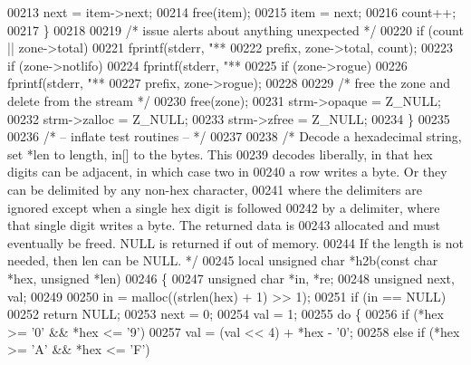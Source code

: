 \begin{DoxyCode}
{{00213         next = item->next;
00214         free(item);
00215         item = next;
00216         count++;
00217     \}
00218 
00219     \textcolor{comment}{/* issue alerts about anything unexpected */}
00220     \textcolor{keywordflow}{if} (count || zone->total)
00221         fprintf(stderr, \textcolor{stringliteral}{"** %
00222                 prefix, zone->total, count);
00223     \textcolor{keywordflow}{if} (zone->notlifo)
00224         fprintf(stderr, \textcolor{stringliteral}{"** %
00225     \textcolor{keywordflow}{if} (zone->rogue)
00226         fprintf(stderr, \textcolor{stringliteral}{"** %
00227                 prefix, zone->rogue);
00228 
00229     \textcolor{comment}{/* free the zone and delete from the stream */}
00230     free(zone);
00231     strm->opaque = Z\_NULL;
00232     strm->zalloc = Z\_NULL;
00233     strm->zfree = Z\_NULL;
00234 \}
00235 
00236 \textcolor{comment}{/* -- inflate test routines -- */}
00237 
00238 \textcolor{comment}{/* Decode a hexadecimal string, set *len to length, in[] to the bytes.  This}
00239 \textcolor{comment}{   decodes liberally, in that hex digits can be adjacent, in which case two in}
00240 \textcolor{comment}{   a row writes a byte.  Or they can be delimited by any non-hex character,}
00241 \textcolor{comment}{   where the delimiters are ignored except when a single hex digit is followed}
00242 \textcolor{comment}{   by a delimiter, where that single digit writes a byte.  The returned data is}
00243 \textcolor{comment}{   allocated and must eventually be freed.  NULL is returned if out of memory.}
00244 \textcolor{comment}{   If the length is not needed, then len can be NULL. */}
00245 local \textcolor{keywordtype}{unsigned} \textcolor{keywordtype}{char} *h2b(\textcolor{keyword}{const} \textcolor{keywordtype}{char} *hex, \textcolor{keywordtype}{unsigned} *len)
00246 \{
00247     \textcolor{keywordtype}{unsigned} \textcolor{keywordtype}{char} *in, *re;
00248     \textcolor{keywordtype}{unsigned} next, val;
00249 
00250     in = malloc((strlen(hex) + 1) >> 1);
00251     \textcolor{keywordflow}{if} (in == NULL)
00252         \textcolor{keywordflow}{return} NULL;
00253     next = 0;
00254     val = 1;
00255     \textcolor{keywordflow}{do} \{
00256         \textcolor{keywordflow}{if} (*hex >= \textcolor{charliteral}{'0'} && *hex <= \textcolor{charliteral}{'9'})
00257             val = (val << 4) + *hex - \textcolor{charliteral}{'0'};
00258         \textcolor{keywordflow}{else} \textcolor{keywordflow}{if} (*hex >= \textcolor{charliteral}{'A'} && *hex <= \textcolor{charliteral}{'F'})
}}}}}
\end{DoxyCode}

